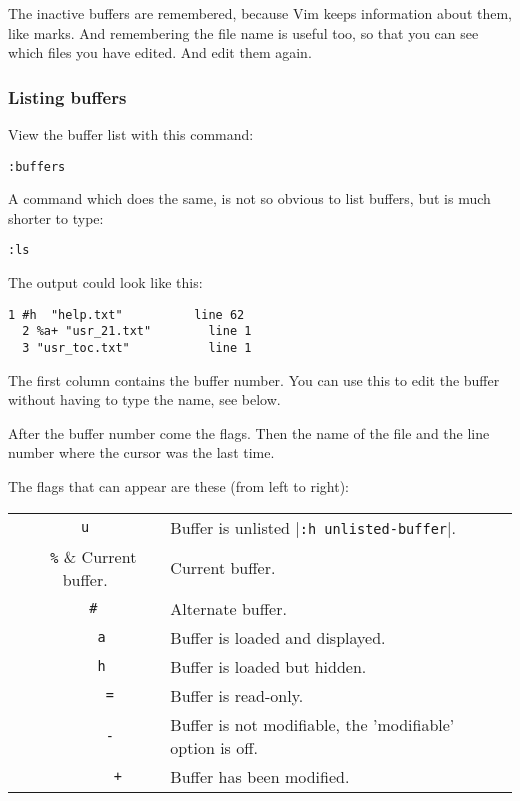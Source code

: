 The inactive buffers are remembered, because Vim keeps information about them, like marks.
And remembering the file name is useful too, so that you can see which files you have edited.
And edit them again.

\subsubsection{Listing buffers}
View the buffer list with this command:

\begin{Verbatim}[samepage=true]
 :buffers
\end{Verbatim}

A command which does the same, is not so obvious to list buffers, but is much shorter to type:

\begin{Verbatim}[samepage=true]
 :ls
\end{Verbatim}

The output could look like this:

\begin{Verbatim}[samepage=true]
  1 #h  "help.txt"          line 62 
  2 %a+ "usr_21.txt"        line 1 
  3 "usr_toc.txt"           line 1 
\end{Verbatim}

The first column contains the buffer number.
You can use this to edit the buffer without having to type the name, see below.

After the buffer number come the flags.
Then the name of the file and the line number where the cursor was the last time.
 
The flags that can appear are these (from left to right):
\begin{center} \begin{tabular}{c l}
				\verb!u! &  Buffer is unlisted |\verb!:h unlisted-buffer!|. \\
				\verb!  %! &  Current buffer. \\
				\verb!  #! &  Alternate buffer. \\
				\verb!    a! & Buffer is loaded and displayed. \\
				\verb!    h! & Buffer is loaded but hidden. \\
				\verb!      =! & Buffer is read-only. \\
				\verb!      -! & Buffer is not modifiable, the 'modifiable' option is off. \\
				\verb!        +! & Buffer has been modified. \\
\end{tabular} \end{center}
